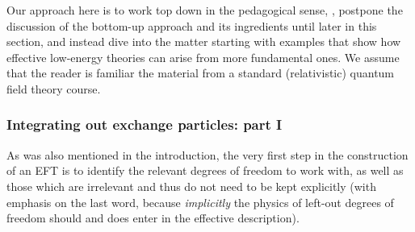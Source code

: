 Our approach here is to work top down in the pedagogical sense, \ie, postpone 
the discussion of the bottom-up approach and its ingredients until later in 
this section, and instead dive into the matter starting with examples that show 
how effective low-energy theories can arise from more fundamental ones.  We 
assume that the reader is familiar the material from a standard 
(relativistic) quantum field theory course.

\subsubsection{Integrating out exchange particles: part I}
\label{sec:EFT-IntOut-1}

As was also mentioned in the introduction, the very first step in 
the construction of an EFT is to identify the relevant degrees of freedom to 
work with, as well as those which are irrelevant and thus do not need to 
be kept explicitly (with emphasis on the last word, because 
\emph{implicitly} the physics of left-out degrees of freedom should and does 
enter in the effective description).

